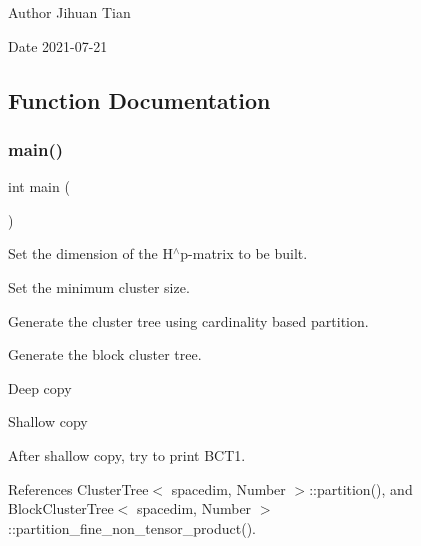 \begin{DoxyAuthor}{Author}
Jihuan Tian 
\end{DoxyAuthor}
\begin{DoxyDate}{Date}
2021-\/07-\/21 
\end{DoxyDate}


\subsection{Function Documentation}
\mbox{\label{bct-copy-constructor_8cc_ae66f6b31b5ad750f1fe042a706a4e3d4}} 
\subsubsection{\texorpdfstring{main()}{main()}}
{\footnotesize\ttfamily int main (\begin{DoxyParamCaption}{ }\end{DoxyParamCaption})}

Set the dimension of the H$^\wedge$p-\/matrix to be built.

Set the minimum cluster size.

Generate the cluster tree using cardinality based partition.

Generate the block cluster tree.

Deep copy

Shallow copy

After shallow copy, try to print B\+C\+T1.

References Cluster\+Tree$<$ spacedim, Number $>$\+::partition(), and Block\+Cluster\+Tree$<$ spacedim, Number $>$\+::partition\+\_\+fine\+\_\+non\+\_\+tensor\+\_\+product().


